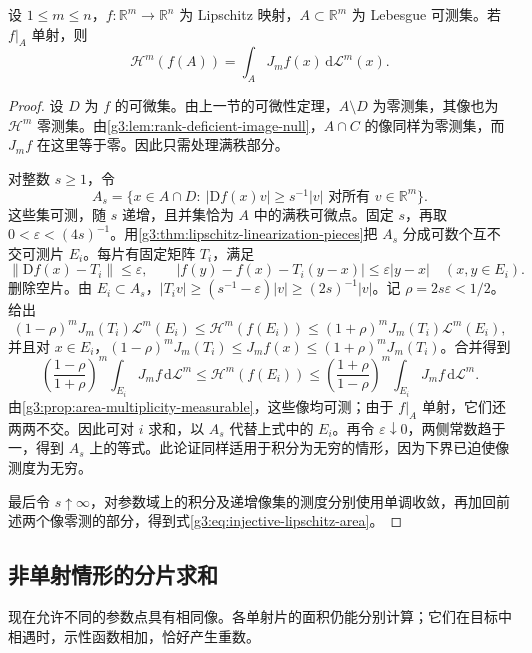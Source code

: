 \begin{theorem}\label{g3:thm:injective-lipschitz-area}
	设 \(1\le m\le n\)，\(f:\mathbb R^m\to\mathbb R^n\) 为 Lipschitz 映射，\(A\subset\mathbb R^m\) 为 Lebesgue 可测集。若 \(f|_A\) 单射，则
	\begin{equation}\label{g3:eq:injective-lipschitz-area}
		\mathcal H^m(f(A))=\int_AJ_mf(x)\,\mathrm d\mathcal L^m(x).
	\end{equation}
\end{theorem}
\begin{proof}
	设 \(D\) 为 \(f\) 的可微集。由上一节的可微性定理，\(A\setminus D\) 为零测集，其像也为 \(\mathcal H^m\) 零测集。由\cref{g3:lem:rank-deficient-image-null}，\(A\cap C\) 的像同样为零测集，而 \(J_mf\) 在这里等于零。因此只需处理满秩部分。

	对整数 \(s\ge1\)，令
	\[
		A_s=\{x\in A\cap D:\ |\mathrm Df(x)v|\ge s^{-1}|v|\text{ 对所有 }v\in\mathbb R^m\}.
	\]
	这些集可测，随 \(s\) 递增，且并集恰为 \(A\) 中的满秩可微点。固定 \(s\)，再取 \(0<\varepsilon<(4s)^{-1}\)。用\cref{g3:thm:lipschitz-linearization-pieces}把 \(A_s\) 分成可数个互不交可测片 \(E_i\)。每片有固定矩阵 \(T_i\)，满足
	\[
		\lVert\mathrm Df(x)-T_i\rVert\le\varepsilon,\qquad
		|f(y)-f(x)-T_i(y-x)|\le\varepsilon|y-x|\quad(x,y\in E_i).
	\]
	删除空片。由 \(E_i\subset A_s\)，\(|T_iv|\ge(s^{-1}-\varepsilon)|v|\ge(2s)^{-1}|v|\)。记 \(\rho=2s\varepsilon<1/2\)。给出
	\[
		(1-\rho)^mJ_m(T_i)\mathcal L^m(E_i)
		\le\mathcal H^m(f(E_i))
		\le(1+\rho)^mJ_m(T_i)\mathcal L^m(E_i),
	\]
	并且对 \(x\in E_i\)，\((1-\rho)^mJ_m(T_i)\le J_mf(x)\le(1+\rho)^mJ_m(T_i)\)。合并得到
	\[
		\left(\frac{1-\rho}{1+\rho}\right)^m\int_{E_i}J_mf\,\mathrm d\mathcal L^m
		\le\mathcal H^m(f(E_i))
		\le\left(\frac{1+\rho}{1-\rho}\right)^m\int_{E_i}J_mf\,\mathrm d\mathcal L^m.
	\]
	由\cref{g3:prop:area-multiplicity-measurable}，这些像均可测；由于 \(f|_A\) 单射，它们还两两不交。因此可对 \(i\) 求和，以 \(A_s\) 代替上式中的 \(E_i\)。再令 \(\varepsilon\downarrow0\)，两侧常数趋于一，得到 \(A_s\) 上的等式。此论证同样适用于积分为无穷的情形，因为下界已迫使像测度为无穷。

	最后令 \(s\uparrow\infty\)，对参数域上的积分及递增像集的测度分别使用单调收敛，再加回前述两个像零测的部分，得到式\eqref{g3:eq:injective-lipschitz-area}。
\end{proof}

\subsection{非单射情形的分片求和}
\label{g3:subsec:2003:04}
现在允许不同的参数点具有相同像。各单射片的面积仍能分别计算；它们在目标中相遇时，示性函数相加，恰好产生重数。

